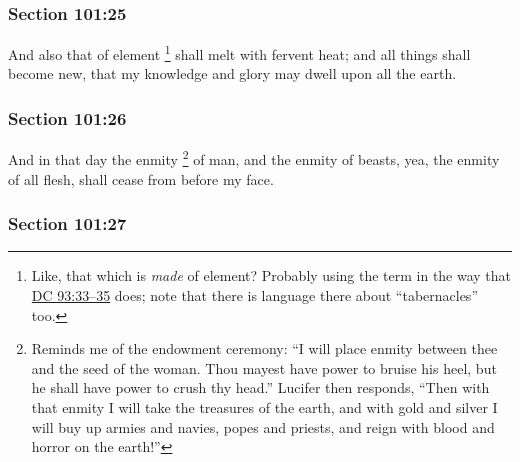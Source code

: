 	\subsubsection{Section 101:25} %
		\label{DC101-25}

		And also that of element%
			\footnote{%
				Like, that which is \textit{made} of element? Probably using the term in the way that \hyperref[DC93-33]{DC 93:33--35} does; note that there is language there about ``tabernacles'' too.
				} 
		shall melt with fervent heat; and all things shall become new, that my knowledge and glory may dwell upon all the earth.


	\subsubsection{Section 101:26} %
		\label{DC101-26}

		And in that day the enmity%
			\footnote{%
				Reminds me of the endowment ceremony: ``I will place enmity between thee and the seed of the woman. Thou mayest have power to bruise his heel, but he shall have power to crush thy head.'' Lucifer then responds, ``Then with that enmity I will take the treasures of the earth, and with gold and silver I will buy up armies and navies, popes and priests, and reign with blood and horror on the earth!''
				}
		of man, and the enmity of beasts, yea, the enmity of all flesh, shall cease from before my face.


	\subsubsection{Section 101:27} %
		\label{DC101-27}

